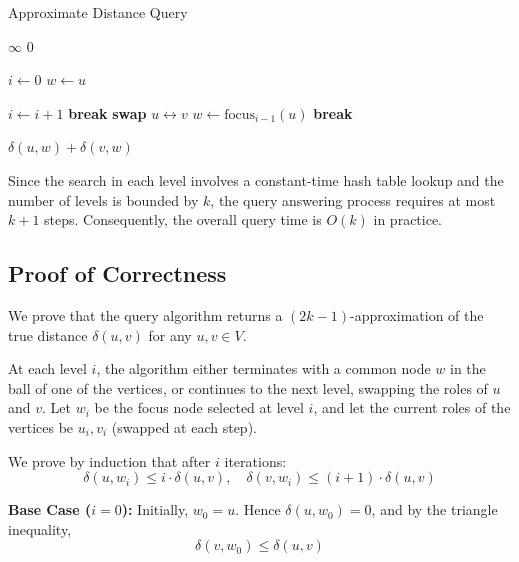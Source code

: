 \documentclass{article}
\begin{document}
\begin{algorithm}[H]
    \caption{Approximate Distance Query}
    \begin{algorithmic}[1]
            \State \Return $\infty$
        \EndIf
         
            \State \Return $0$
        \EndIf
    
        \State $i \gets 0$
        \State $w \gets u$
        
            \State $i \gets i + 1$
             
                \State \textbf{break}
            \EndIf
            \State \textbf{swap} $u \leftrightarrow v$
            \State $w \gets \text{focus}_{i-1}(u)$
             
                \State \textbf{break}
            \EndIf
        \EndWhile
    
        \Return $\delta(u, w) + \delta(v, w)$
    \EndFunction
    \end{algorithmic}
    \end{algorithm}

Since the search in each level involves a constant-time hash table lookup and the number of levels is bounded by \(k\), the query answering process requires at most \(k+1\) steps.  Consequently, the overall query time is \(O(k)\) in practice.

\subsection{Proof of Correctness}

We prove that the query algorithm returns a \((2k-1)\)-approximation of the true distance \(\delta(u, v)\) for any \(u, v \in V\).

At each level \(i\), the algorithm either terminates with a common node \(w\) in the ball of one of the vertices, or continues to the next level, swapping the roles of \(u\) and \(v\). Let \(w_i\) be the focus node selected at level \(i\), and let the current roles of the vertices be \(u_i, v_i\) (swapped at each step).

We prove by induction that after \(i\) iterations:
\[
\delta(u, w_i) \le i \cdot \delta(u, v), \quad
\delta(v, w_i) \le (i+1) \cdot \delta(u, v)
\]

\textbf{Base Case (\(i=0\)):}  
Initially, \(w_0 = u\). Hence \(\delta(u, w_0) = 0\), and by the triangle inequality,
\[
\delta(v, w_0) \le \delta(u, v)
\]
\end{document}
